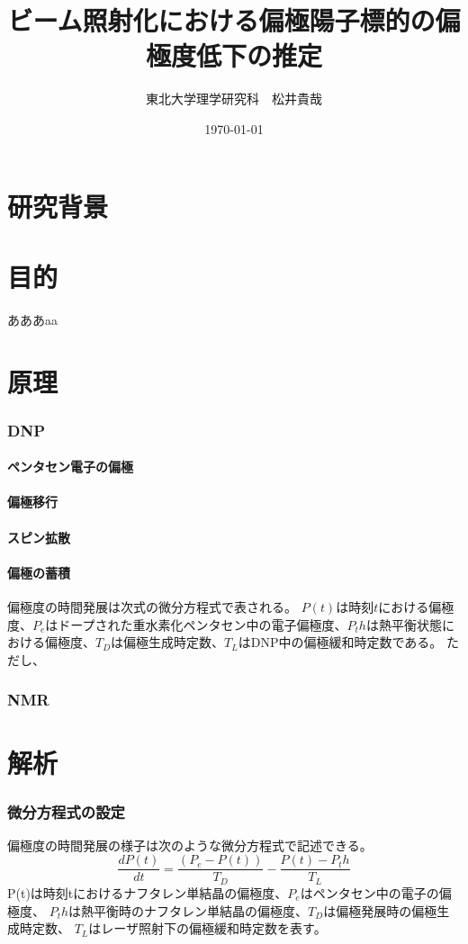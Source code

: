 \documentclass[a5j]{jsarticle}
\title{ビーム照射化における偏極陽子標的の偏極度低下の推定}
\author{東北大学理学研究科　松井貴哉}
\date{\today}
\begin{document}
\maketitle
\part{研究背景}

\part{目的}
あああaa
\part{原理}
\section{DNP}
\subsection{ペンタセン電子の偏極}
\subsection{偏極移行}
\subsection{スピン拡散}
\subsection{偏極の蓄積}
偏極度の時間発展は次式の微分方程式で表される。
$P(t)$は時刻$t$における偏極度、$P_e$はドープされた重水素化ペンタセン中の電子偏極度、$P_th$は熱平衡状態における偏極度、$T_D$は偏極生成時定数、$T_L$はDNP中の偏極緩和時定数である。
ただし、


\section{NMR}


\part{解析}

\section{微分方程式の設定}
偏極度の時間発展の様子は次のような微分方程式で記述できる。
\begin{equation}
  \frac{dP(t)}{dt}=\frac{(P_e-P(t))}{T_D}-\frac{P(t)-P_th}{T_L}
\end{equation}
P(t)は時刻tにおけるナフタレン単結晶の偏極度、$P_e$はペンタセン中の電子の偏極度、
$P_th$は熱平衡時のナフタレン単結晶の偏極度、$T_D$は偏極発展時の偏極生成時定数、 $T_L$はレーザ照射下の偏極緩和時定数を表す。
\end{document}
